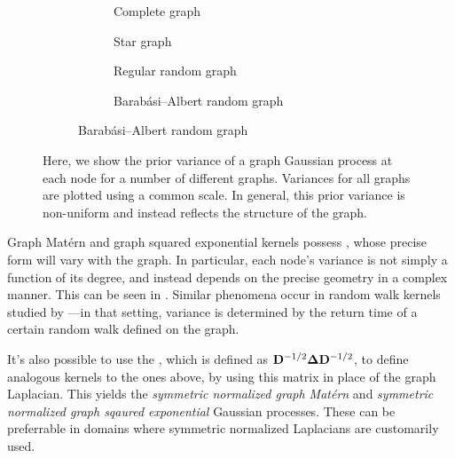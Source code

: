 \documentclass[11pt]{book}
\begin{document}
\begin{figure}
\begin{subfigure}{0.05\textwidth}

\end{subfigure}
\begin{subfigure}{0.94\textwidth}
\begin{subfigure}{0.49\textwidth}

\caption{Complete graph}
\end{subfigure}
\begin{subfigure}{0.49\textwidth}

\caption{Star graph}
\end{subfigure}
\begin{subfigure}{0.49\textwidth}

\caption{Regular random graph}
\end{subfigure}
\begin{subfigure}{0.49\textwidth}

\caption{Barabási--Albert random graph}
\end{subfigure}
\end{subfigure}
\caption[Graph Matérn kernels]{Here, we show the prior variance of a graph Gaussian process at each node for a number of different graphs. Variances for all graphs are plotted using a common scale. In general, this prior variance is non-uniform and instead reflects the structure of the graph.}
\label{fig:graph-variance}
\end{figure}

Graph Matérn and graph squared exponential kernels possess , whose precise form will vary with the graph.
In particular, each node's variance is not simply a function of its degree, and instead depends on the precise geometry in a complex manner.
This can be seen in .
Similar phenomena occur in random walk kernels studied by \textcite{urry13}---in that setting, variance is determined by the return time of a certain random walk defined on the graph.

It's also possible to use the , which is defined as $\m{D}^{-1/2}\m\lap\m{D}^{-1/2}$, to define analogous kernels to the ones above, by using this matrix in place of the graph Laplacian.
This yields the \emph{symmetric normalized graph Matérn} and \emph{symmetric normalized graph sqaured exponential} Gaussian processes.
These can be preferrable in domains where symmetric normalized Laplacians are customarily used.
\end{document}
